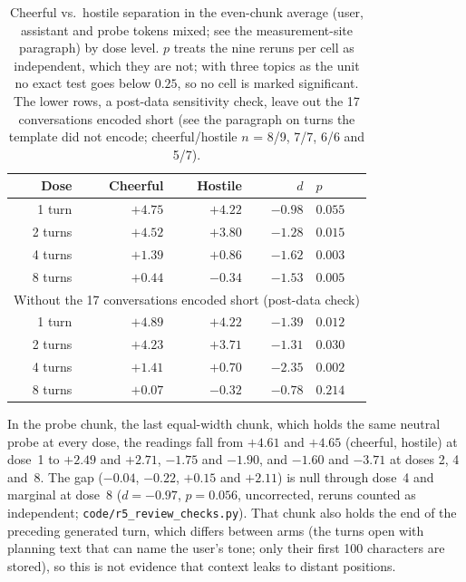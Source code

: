 \documentclass[11pt,a4paper]{article}
\begin{document}
\begin{table}[H]
\centering
\caption{Cheerful vs.\ hostile separation in the even-chunk average
(user, assistant and probe tokens mixed; see the measurement-site
paragraph) by dose level. $p$ treats the nine reruns per cell as
independent, which they are not; with three topics as the unit no exact
test goes below $0.25$, so no cell is marked significant. The lower rows, a post-data sensitivity check, leave out the 17 conversations encoded short (see the paragraph on turns the template did not encode; cheerful/hostile $n$ = 8/9, 7/7, 6/6 and 5/7).}
\label{tab:dose}
\begin{tabular}{rrrrl}
\toprule
Dose & Cheerful & Hostile & $d$ & $p$ \\
\midrule
1 turn & $+4.75$ & $+4.22$ & $-0.98$ & $0.055$ \\
2 turns & $+4.52$ & $+3.80$ & $-1.28$ & $0.015$ \\
4 turns & $+1.39$ & $+0.86$ & $-1.62$ & $0.003$ \\
8 turns & $+0.44$ & $-0.34$ & $-1.53$ & $0.005$ \\
\midrule
\multicolumn{5}{l}{Without the 17 conversations encoded short (post-data check)} \\
1 turn & $+4.89$ & $+4.22$ & $-1.39$ & $0.012$ \\
2 turns & $+4.23$ & $+3.71$ & $-1.31$ & $0.030$ \\
4 turns & $+1.41$ & $+0.70$ & $-2.35$ & $0.002$ \\
8 turns & $+0.07$ & $-0.32$ & $-0.78$ & $0.214$ \\
\bottomrule
\end{tabular}
\end{table}

In the probe chunk, the last equal-width chunk, which holds the same
neutral probe at every dose, the readings fall from $+4.61$ and $+4.65$
(cheerful, hostile) at dose~1 to $+2.49$ and $+2.71$, $-1.75$ and
$-1.90$, and $-1.60$ and $-3.71$ at doses 2, 4 and~8. The gap ($-0.04$,
$-0.22$, $+0.15$ and $+2.11$) is null through dose~4 and marginal at
dose~8 ($d{=}-0.97$, $p{=}0.056$, uncorrected, reruns counted as
independent; \texttt{code/r5\_review\_checks.py}). That chunk also holds
the end of the preceding generated turn, which differs between arms
(the turns open with planning text that can name the user's tone; only
their first 100 characters are stored), so this is not evidence that
context leaks to distant positions.
\end{document}
